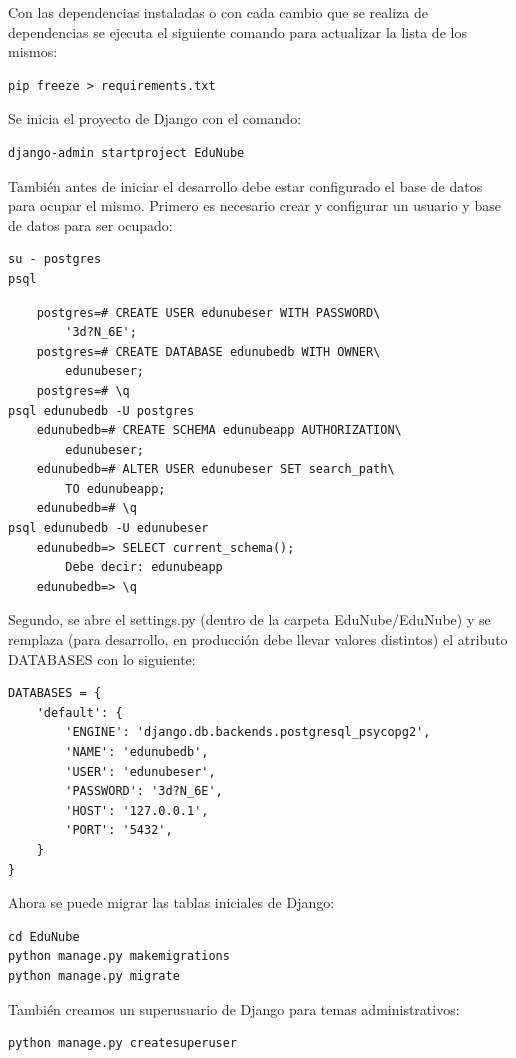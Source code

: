 Con las dependencias instaladas o con cada cambio que se realiza de dependencias se ejecuta el siguiente comando para actualizar la lista de los mismos:

\begin{lstlisting}
pip freeze > requirements.txt
\end{lstlisting}

Se inicia el proyecto de Django con el comando:

\begin{lstlisting}
django-admin startproject EduNube
\end{lstlisting}

También antes de iniciar el desarrollo debe estar configurado el base de datos para ocupar el mismo. Primero es necesario crear y configurar un usuario y base de datos para ser ocupado:

\begin{lstlisting}
su - postgres
psql
\end{lstlisting}
\begin{lstlisting}
	postgres=# CREATE USER edunubeser WITH PASSWORD\
    	'3d?N_6E';
	postgres=# CREATE DATABASE edunubedb WITH OWNER\
    	edunubeser;
	postgres=# \q
psql edunubedb -U postgres
	edunubedb=# CREATE SCHEMA edunubeapp AUTHORIZATION\
    	edunubeser;
	edunubedb=# ALTER USER edunubeser SET search_path\
    	TO edunubeapp;
	edunubedb=# \q
psql edunubedb -U edunubeser
	edunubedb=> SELECT current_schema();
		Debe decir: edunubeapp
	edunubedb=> \q
\end{lstlisting}

Segundo, se abre el settings.py (dentro de la carpeta EduNube/EduNube) y se remplaza (para desarrollo, en producción debe llevar valores distintos) el atributo DATABASES con lo siguiente:
\lstset{language=Python}
\begin{lstlisting}
DATABASES = {
    'default': {
        'ENGINE': 'django.db.backends.postgresql_psycopg2',
        'NAME': 'edunubedb',
        'USER': 'edunubeser',
        'PASSWORD': '3d?N_6E',
        'HOST': '127.0.0.1',
        'PORT': '5432',
    }
}
\end{lstlisting}
\lstset{language=Bash}

Ahora se puede migrar las tablas iniciales de Django:
\begin{lstlisting}
cd EduNube
python manage.py makemigrations
python manage.py migrate
\end{lstlisting}

También creamos un superusuario de Django para temas administrativos:
\begin{lstlisting}
python manage.py createsuperuser
\end{lstlisting}

